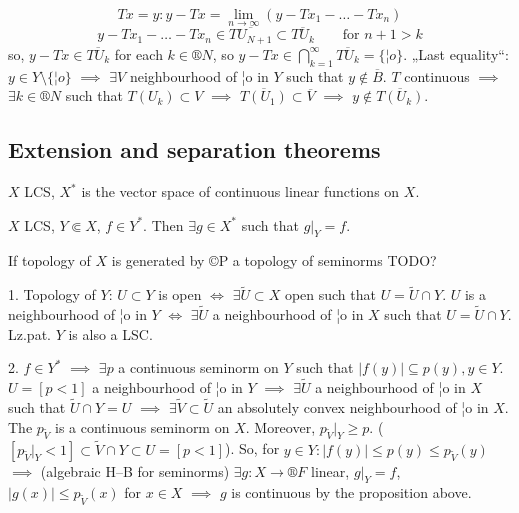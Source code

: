 \documentclass[12pt]{article}					%
\begin{document}
\begin{veta}
\begin{dukazin}
		$$ Tx = y: y - Tx = \lim_{n \rightarrow ∞} (y - Tx_1 - … - Tx_n) $$
		$$ y - Tx_1 - … - Tx_n \in \overline{TU_{N+1}} \subset \overline{TU_k} \qquad \text{for $n+1 > k$} $$
		so, $y - Tx \in \overline{TU_k}$ for each $k \in ®N$, so $y - Tx \in \bigcap_{k=1}^∞ \overline{TU_k} = \{¦o\}$. „Last equality“: $y \in Y \setminus \{¦o\}$ $\implies$ $\exists V$ neighbourhood of ¦o in $Y$ such that $y \notin \overline{B}$. $T$ continuous $\implies$ $\exists k \in ®N$ such that $T(U_k) \subset V$ $\implies$ $\overline{T(U_1)} \subset \overline{V}$ $\implies$ $y \notin \overline{T(U_k)}$.
	\end{dukazin}
\end{veta}

\subsection{Extension and separation theorems}
\begin{definice}
	$X$ LCS, $X^*$ is the vector space of continuous linear functions on $X$.
\end{definice}

\begin{veta}
	$X$ LCS, $Y \Subset X$, $f \in Y^*$. Then $\exists g \in X^*$ such that $g|_Y = f$.

	\begin{poznamkain}
		If topology of $X$ is generated by ©P a topology of seminorms TODO?
	\end{poznamkain}

	\begin{dukazin}
		1. Topology of $Y$: $U \subset Y$ is open $\Leftrightarrow$ $\exists \tilde U \subset X$ open such that $U = \tilde U \cap Y$. $U$ is a neighbourhood of ¦o in $Y$ $\Leftrightarrow$ $\exists \tilde U$ a neighbourhood of ¦o in $X$ such that $U = \tilde U \cap Y$. Lz.pat. $Y$ is also a LSC.

		2. $f \in Y^*$ $\implies$ $\exists p$ a continuous seminorm on $Y$ such that $|f(y)| \subseteq p(y), y \in Y$. $U = [p < 1]$ a neighbourhood of ¦o in $Y$ $\implies$ $\exists \tilde U$ a neighbourhood of ¦o in $X$ such that $\tilde U \cap Y = U$ $\implies$ $\exists \tilde V \subset \tilde U$ an absolutely convex neighbourhood of ¦o in $X$. The $p_{\tilde V}$ is a continuous seminorm on $X$. Moreover, $p_{\tilde V}|_Y ≥ p$. ($[p_{\tilde V}|_Y < 1] \subset \tilde V \cap Y \subset U = [p < 1]$). So, for $y \in Y: |f(y)| ≤ p(y) ≤ p_{\tilde V}(y)$ $\implies$ (algebraic H–B for seminorms) $\exists g: X \rightarrow ®F$ linear, $g|_Y = f$, $|g(x)| ≤ p_{\tilde V}(x)$ for $x \in X$ $\implies$ $g$ is continuous by the proposition above.
	\end{dukazin}
\end{veta}
\end{document}
